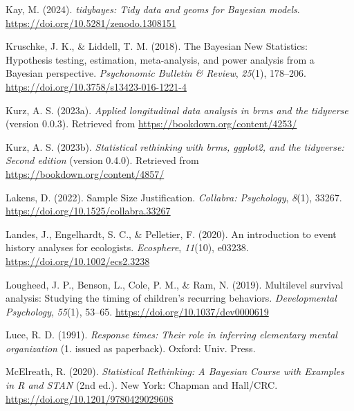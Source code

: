 \documentclass[
  man, donotrepeattitle,floatsintext]{apa6}
\newlength{\cslhangindent}
\newenvironment{CSLReferences}[2] %
 {\begin{list}{}{%
  \setlength{\itemindent}{0pt}
  \setlength{\leftmargin}{0pt}
  \setlength{\parsep}{0pt}
  \ifodd #1
   \setlength{\leftmargin}{\cslhangindent}
   \setlength{\itemindent}{-1\cslhangindent}
  \fi
  \setlength{\itemsep}{#2\baselineskip}}}
 {\end{list}}
\begin{document}
\begin{CSLReferences}{1}{0}
Kay, M. (2024). \emph{{tidybayes}: Tidy data and geoms for {Bayesian} models}. \url{https://doi.org/10.5281/zenodo.1308151}

Kruschke, J. K., \& Liddell, T. M. (2018). The {Bayesian New Statistics}: {Hypothesis} testing, estimation, meta-analysis, and power analysis from a {Bayesian} perspective. \emph{Psychonomic Bulletin \& Review}, \emph{25}(1), 178--206. \url{https://doi.org/10.3758/s13423-016-1221-4}

Kurz, A. S. (2023a). \emph{Applied longitudinal data analysis in brms and the tidyverse} (version 0.0.3). Retrieved from \url{https://bookdown.org/content/4253/}

Kurz, A. S. (2023b). \emph{Statistical rethinking with brms, ggplot2, and the tidyverse: {Second} edition} (version 0.4.0). Retrieved from \url{https://bookdown.org/content/4857/}

Lakens, D. (2022). Sample {Size Justification}. \emph{Collabra: Psychology}, \emph{8}(1), 33267. \url{https://doi.org/10.1525/collabra.33267}

Landes, J., Engelhardt, S. C., \& Pelletier, F. (2020). An introduction to event history analyses for ecologists. \emph{Ecosphere}, \emph{11}(10), e03238. \url{https://doi.org/10.1002/ecs2.3238}

Lougheed, J. P., Benson, L., Cole, P. M., \& Ram, N. (2019). Multilevel survival analysis: {Studying} the timing of children's recurring behaviors. \emph{Developmental Psychology}, \emph{55}(1), 53--65. \url{https://doi.org/10.1037/dev0000619}

Luce, R. D. (1991). \emph{Response times: Their role in inferring elementary mental organization} (1. issued as paperback). Oxford: Univ. Press.

McElreath, R. (2020). \emph{Statistical {Rethinking}: {A Bayesian Course} with {Examples} in {R} and {STAN}} (2nd ed.). New York: {Chapman and Hall/CRC}. \url{https://doi.org/10.1201/9780429029608}


\end{CSLReferences}
\end{document}
